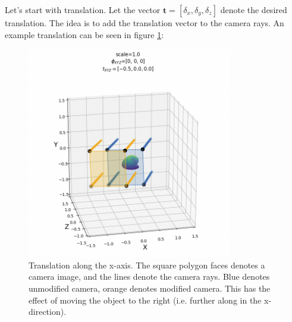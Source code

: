 Let's start with translation. Let the vector $\textbf{t} = [\delta_x, \delta_y, \delta_z]$ denote the desired translation. The idea is to add the translation vector to the camera rays. An example translation can be seen in figure \ref{fig:manip-trans}:
\begin{figure}[H]
    \centering
    \includegraphics[width=0.8\textwidth]{figures/manip-trans.png}
    \caption{Translation along the x-axis. The square polygon faces denotes a camera image, and the lines denote the camera rays. Blue denotes unmodified camera, orange denotes modified camera. This has the effect of moving the object to the right (i.e. further along in the x-direction).}
    \label{fig:manip-trans}
\end{figure}


